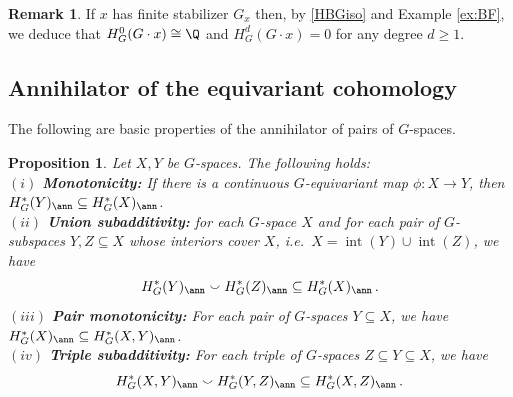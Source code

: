 \documentclass[11pt,a4paper,reqno]{article}
\DeclareMathOperator{\interior}{int}
\numberwithin{equation}{section}
\newtheorem{proposition}[theorem]{Proposition}
\theoremstyle{definition}
\newtheorem{remark}[theorem]{Remark}
\begin{document}
\begin{remark}\label{rm:finite stabilizer}
If $x$ has finite stabilizer $G_x$ then, by 
\eqref{HBGiso} and
Example \ref{ex:BF}, we 
deduce that 
$  H_G^0 (G\cdot x) \cong \Q$ and $ H_G^d (G\cdot x)=0 $ for any degree $d \geq 1 $. 
\end{remark}









\subsection{Annihilator of the equivariant cohomology}\label{ss:free_ann}
The following are basic properties of the annihilator of pairs of $G$-spaces.

\begin{proposition}\label{p:ann}
Let $X, Y $ be $G$-spaces. The following holds:  
\\[1mm]
$(i)$ \textnormal{\textbf{Monotonicity:}}   If there is a continuous $G$-equivariant map $\phi:X\to Y$, then
$ H^*_G(Y)_\ann\subseteq H^*_G(X)_\ann $.
\\[1mm]
$(ii)$
\textnormal{\textbf{Union subadditivity:}} for each $G$-space $X$ and for each pair of $G$-subspaces $Y,Z\subseteq X$ whose interiors cover $X$, i.e.~$X=\interior(Y)\cup\interior(Z)$, we have
\[H^*_G(Y)_\ann\smallsmile H^*_G(Z)_\ann\subseteq H^*_G(X)_\ann \, . \] 
$(iii)$
\textnormal{\textbf{Pair monotonicity:}} For each pair of $G$-spaces $Y\subseteq X$, we have 
$
H^*_G(X)_\ann\subseteq H^*_G(X,Y)_\ann $.  
\\[1mm]
$(iv)$ \textnormal{\textbf{Triple subadditivity:}} For each triple of $G$-spaces $Z\subseteq Y\subseteq X$, we have
\begin{equation}
\label{intriple}H^*_G(X,Y)_\ann\smallsmile H^*_G(Y,Z)_\ann \subseteq H^*_G(X,Z)_\ann \, . 
\end{equation}
\end{proposition}
\end{document}
